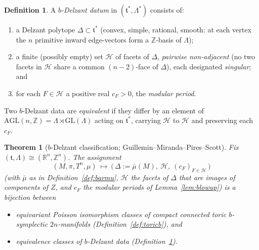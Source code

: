 \documentclass{amsart}
\newtheorem{theorem}{Theorem}
\theoremstyle{definition}
\newtheorem{definition}{Definition}
\begin{document}
\begin{definition}\label{def:bdelzant}
A \emph{$b$-Delzant datum} in $(\mathfrak t^*,\Lambda^*)$ consists of:
\begin{enumerate}
\item a Delzant polytope $\Delta\subset\mathfrak t^*$ (convex, simple, rational,
smooth: at each vertex the $n$ primitive inward edge-vectors form a $\mathbb
Z$-basis of $\Lambda$);
\item a finite (possibly empty) set $\mathcal H$ of facets of $\Delta$,
\emph{pairwise non-adjacent} (no two facets in $\mathcal H$ share a common
$(n-2)$-face of $\Delta$), each designated \emph{singular}; and
\item for each $F\in\mathcal H$ a positive real $c_F>0$, the \emph{modular
period}.
\end{enumerate}
Two $b$-Delzant data are \emph{equivalent} if they differ by an element of
$\mathrm{AGL}(n,\mathbb Z)=\Lambda\rtimes\mathrm{GL}(\Lambda)$ acting on
$\mathfrak t^*$, carrying $\mathcal H$ to $\mathcal H$ and preserving each $c_F$.
\end{definition}

\begin{theorem}[$b$-Delzant classification; Guillemin--Miranda--Pires--Scott]
\label{thm:main}
Fix $(\mathfrak t,\Lambda)\cong(\mathbb R^n,\mathbb Z^n)$. The assignment
\[
(M,\pi,T^n,\mu)\ \longmapsto\
\bigl(\,\Delta:=\bar\mu(M),\ \mathcal H,\ (c_F)_{F\in\mathcal H}\,\bigr)
\]
(with $\bar\mu$ as in Definition~\ref{def:barmu}, $\mathcal H$ the facets of
$\Delta$ that are images of components of $Z$, and $c_F$ the modular periods of
Lemma~\ref{lem:blowup}) is a bijection between
\begin{itemize}
\item equivariant Poisson isomorphism classes of compact connected toric
$b$-symplectic $2n$-manifolds (Definition~\ref{def:toricb}), and
\item equivalence classes of $b$-Delzant data (Definition~\ref{def:bdelzant}).
\end{itemize}
\end{theorem}
\end{document}
